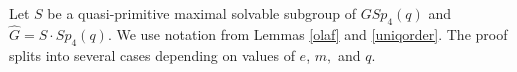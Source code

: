 \begin{comment}
Let $r=3$ and let $\hat{T}$ be a Sylow $3$-subgroup of $S$. Since $|S:C|=2$, $\hat{T}$ lies in $C$. Therefore, $\hat{T}=T_1 \times T_2$ where $|T_1|=3$ and $T_2$ is the Sylow $3$-subgroup of $A$, since $A$ centralises $C.$ Thus, $A$ normalises $\hat{T}$ and the number of Sylow $3$-subgroups in $S$ is at most $|S:A|=48.$ If $T$ is the image of $\hat{T}$ in $PGL_4(q)$ and 3 does not divide $(q+1)$, then $|T|=3$ and there are 2 elements of order 3 in $T$, so $|x^G \cap H| \le 48 \cdot 2.$ If 3 divides $(q+1)$, then there are $8$ elements in $T$ since $F$ is cyclic, so $|x^G \cap H| \le 48 \cdot 8.$ If $p\ne 3$ we use  \eqref{42} for $|x^G|$. If $p=3$ then by \cite[Proposition 3.22]{fpr2}
$$|x^G|>\frac{1}{2}\left(\frac{q}{q+1} \right) \max(q^{2s(n-s),q^{ns}}).$$ Therefore, if $p \ne 3$ and 3 divide $(q+1)$, then \eqref{40}  gives us
\begin{equation*}
\begin{aligned}
Q_{3} & = \sum_{{x} \in \mathscr{P}; |x|=3}\fpr({x})^2 = \sum_{{x} \in \mathscr{P}; |x|=2} \left(\frac{|x^G \cap H|}{|x^G|}\right) ^2\\
 & <  \left(q\left(\frac{(48 \cdot 8)^2}{1/2 \cdot q^6} \right) +q^3\left(\frac{(48 \cdot 8)^2}{1/2 \cdot q^8} \right) + q^4\left(\frac{(48 \cdot 8)^2}{1/2 \cdot q^{12}} \right) \right) 
\end{aligned}
\end{equation*}
 If $p \ne 3$ and 3 does not divide $(q+1)$ then   
$$Q_3 = \left(q\left(\frac{(48 \cdot 2)^2}{1/2  \cdot q^6} \right) +q^3\left(\frac{(48 \cdot 2)^2}{1/2  \cdot q^8} \right) + q^4\left(\frac{(48  \cdot 2)^2}{1/2  \cdot q^{12}} \right) \right). 
$$
If $p = 3$ then

$$Q_3 = \left(\left(\frac{(48 \cdot 2)^2}{1/2 (q/(q+1)) \cdot q^6} \right) +3\left(\frac{(48 \cdot 2)^2}{1/2 (q/(q+1)) \cdot q^8} \right) + 3^{3/2}\left(\frac{(48 \cdot 2)^2}{1/2 (q/(q+1)) \cdot q^{12}} \right) \right). 
$$  

Computations show that $Q(G,2)\le Q_1+Q_2+Q_3 <1$ for $q>11.$ If $q \le 11$ then  $b_S(GL_4(q))=2$ is established using {\sf GAP}.
\end{comment}





\medskip

Let $S$ be a quasi-primitive maximal solvable subgroup  of $GSp_4(q)$ and $\hat{G}=S \cdot Sp_4(q).$ We use notation from Lemmas \ref{olaf} and \ref{uniqorder}. The proof splits into several cases depending on values of $e$, $m,$ and $q$.

